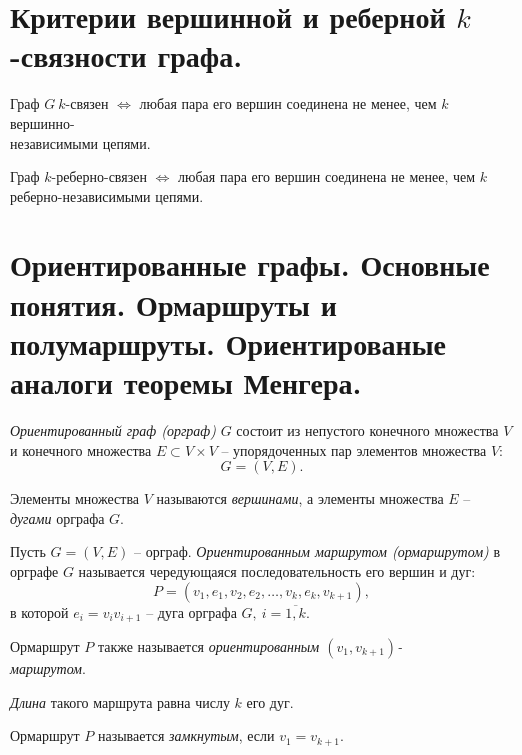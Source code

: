 \section{Критерии вершинной и реберной $k$-связности графа.}

\begin{corollary}
    Граф $ G \ k $-связен $ \iff $ любая пара его вершин соединена не менее, чем $ k $ вершинно-\\независимыми цепями.
\end{corollary}

\begin{corollary}
    Граф $ k $-реберно-связен $ \iff $ любая пара его вершин соединена не менее, чем $ k $ реберно-независимыми цепями.
\end{corollary}

\newpage

\section{Ориентированные графы. Основные понятия. Ормаршруты и полумаршруты. Ориентированые аналоги теоремы Менгера.}

\begin{definition}
    \emph{Ориентированный граф (орграф)} $ G $ состоит из непустого конечного множества $ V $ и конечного множества $ E \subset V \times V $ -- упорядоченных пар элементов множества $ V $:
    \[
        G = (V,E).
    \]

    Элементы множества $ V $ называются \emph{вершинами}, а элементы множества $ E $ -- \emph{дугами} орграфа $ G $.
\end{definition}

\begin{definition}
    Пусть $ G = (V,E) $ -- орграф. \emph{Ориентированным маршрутом (ормаршрутом)} в орграфе $ G $ называется чередующаяся последовательность его вершин и дуг:
    \[
        P = (v_1,e_1,v_2,e_2,\ldots,v_k,e_k,v_{k+1}),
    \]
    в которой $ e_i = v_iv_{i+1} $ -- дуга орграфа $ G, \ i = \overline{1,k} $.

    Ормаршрут $ P $ также называется \emph{ориентированным $ (v_1,v_{k+1}) $-\\маршрутом}.

    \emph{Длина} такого маршрута равна числу $ k $ его дуг.

    Ормаршрут $ P $ называется \emph{замкнутым}, если $ v_1 = v_{k+1} $.
\end{definition}

